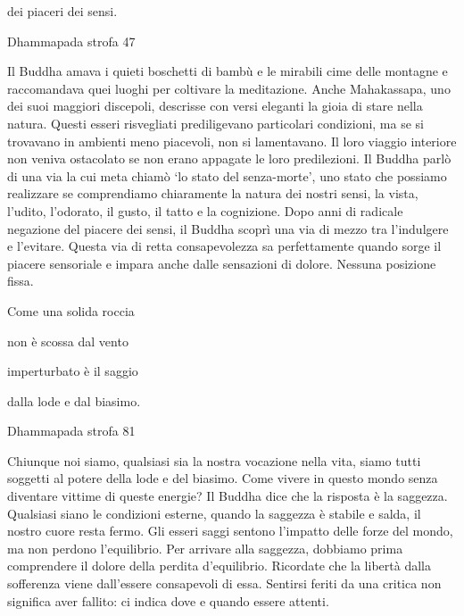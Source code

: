 \documentclass[a4paper,portrait,12pt]{article}
\begin{document}
dei piaceri dei sensi.	





Dhammapada strofa 47


\newpage



Il Buddha amava i quieti boschetti di bambù e le mirabili cime delle montagne e raccomandava quei luoghi per coltivare la meditazione. Anche Mahakassapa, uno dei suoi maggiori discepoli, descrisse con versi eleganti la gioia di stare nella natura. Questi esseri risvegliati prediligevano particolari condizioni, ma se si trovavano in ambienti meno piacevoli, non si lamentavano. Il loro viaggio interiore non veniva ostacolato se non erano appagate le loro predilezioni. Il Buddha parl\`{o} di una via la cui meta chiam\`{o} `lo stato del senza-morte', uno stato che possiamo realizzare se comprendiamo chiaramente la natura dei nostri sensi, la vista, l'udito, l'odorato, il gusto, il tatto e la cognizione. Dopo anni di radicale negazione del piacere dei sensi, il Buddha scoprì una via di mezzo tra l'indulgere e l'evitare. Questa via di retta consapevolezza sa perfettamente quando sorge il piacere sensoriale e impara anche dalle sensazioni di dolore. Nessuna posizione fissa.


\newpage



Come una solida roccia


non \`{e} scossa dal vento


imperturbato \`{e} il saggio


dalla lode e dal biasimo.





Dhammapada strofa 81


\newpage



Chiunque noi siamo, qualsiasi sia la nostra vocazione nella vita, siamo tutti soggetti al potere della lode e del biasimo.  Come vivere in questo mondo senza diventare vittime di queste energie? Il Buddha dice che la risposta \`{e} la saggezza. Qualsiasi siano le condizioni esterne, quando la saggezza \`{e} stabile e salda, il nostro cuore resta fermo. Gli esseri saggi sentono l'impatto delle forze del mondo, ma non perdono l'equilibrio. Per arrivare alla saggezza, dobbiamo prima comprendere il dolore della perdita d'equilibrio. Ricordate che la libert\`{a} dalla sofferenza viene dall'essere consapevoli di essa. Sentirsi feriti da una critica non significa aver fallito: ci indica dove e quando essere attenti.
\end{document}
